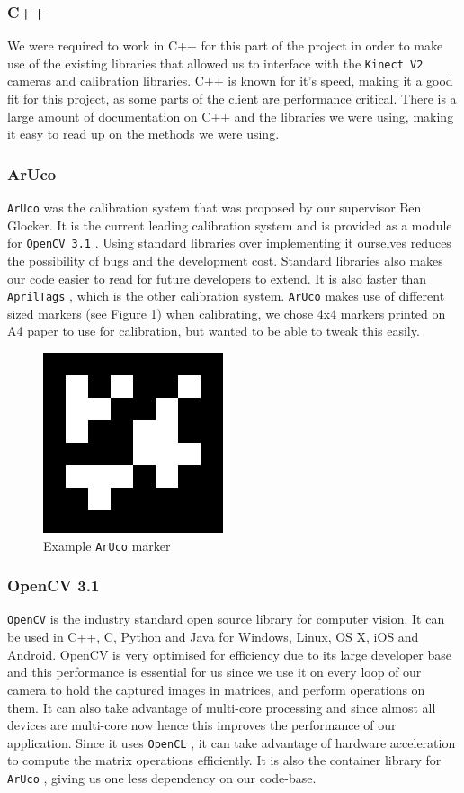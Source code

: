 \documentclass{article}
\begin{document}
\subsubsection{C++}
We were required to work in C++ for this part of the project in order to make use of the existing libraries that allowed us to interface with the \texttt{Kinect V2} cameras and calibration libraries. C++ is known for it's speed,
making it a good fit for this project, as some parts of the client are performance critical. There is a large amount of documentation on C++ and the libraries we were using, making it easy to read up on the methods we were using.
\subsubsection{ArUco}
\texttt{ArUco} \cite{aruco} was the calibration system that was proposed by our supervisor Ben Glocker. It is the current leading calibration system and is provided as a module for \texttt{OpenCV 3.1} \cite{opencv}. Using standard libraries over implementing it ourselves reduces the possibility of bugs and the development cost. Standard libraries also makes our code easier to read for future developers to extend. It is also faster than \texttt{AprilTags} \cite{april}, which is the other calibration system. \texttt{ArUco} \cite{aruco} makes use of different sized markers (see Figure \ref{fig:arucomarker}) when calibrating, we chose 4x4 markers printed on A4 paper to use for calibration, but wanted to be able to tweak this easily.
\begin{figure}[h]
  \centering
  \includegraphics[scale=0.6]{aruco}
  \caption{Example \texttt{ArUco} \cite{aruco} marker}  
  \label{fig:arucomarker}
\end{figure} 
\subsubsection{OpenCV 3.1}
\texttt{OpenCV} \cite{opencv} is the industry standard open source library for computer vision. It can be used in C++, C, Python and Java for Windows, Linux, OS X, iOS and Android. OpenCV is very optimised for efficiency due to its large developer base and this performance is essential for us since we use it on every loop of our camera to hold the captured images in matrices, and perform operations on them. It can also take advantage of multi-core processing and since almost all devices are multi-core now hence this improves the performance of our application. Since it uses \texttt{OpenCL} \cite{opencl}, it can take advantage of hardware acceleration to compute the matrix operations efficiently. It is also the container library for \texttt{ArUco} \cite{aruco}, giving us one less dependency on our code-base.
\end{document}
